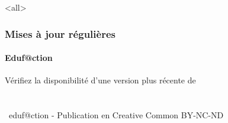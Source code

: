 \documentclass[ignorenonframetext,allowframebreaks,aspectratio=169,t,8pt, xcolor=table]{beamer}
\begin{document}
\begin{frame}
\begin{columns}
\begin{column}{0.1\textwidth}
\begin{figure}
 \end{figure}
\end{column}
\begin{column}{0.9\textwidth}
           
\end{column}
\end{columns}
\end{frame}


\mode<all>{}
\begin{frame}
\frametitle{Mises à jour régulières}
\framesubtitle{Eduf@ction~\umaila}
{\begin{center} 
{Vérifiez la disponibilité d'une version plus récente de} \\
{ }   \\ 
{{\huge\ccbyncndeu}}  \\  
{\the\year~eduf@ction - Publication en Creative Common BY-NC-ND }    \\  %
{\safeqrcode[padding]{\GITfilename}}  
\end{center} }
\end{frame}
\end{document}
